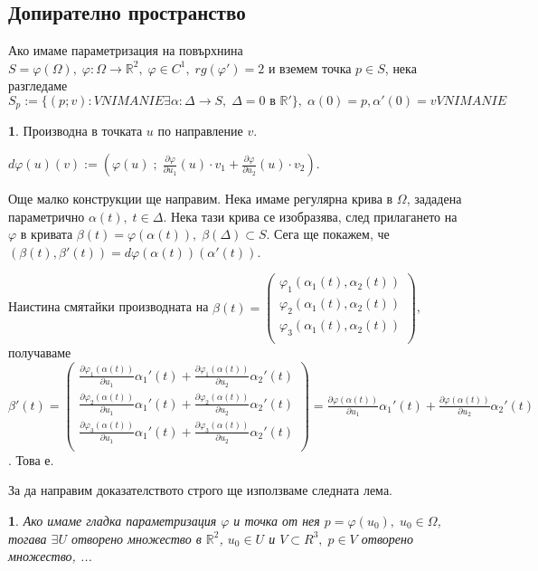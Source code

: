 \documentclass[11pt]{article}
\numberwithin{equation}{section}
\numberwithin{figure}{section}
\numberwithin{table}{section}
\theoremstyle{plain}
\theoremstyle{definition}
\newtheorem{defn}[thm]{\protect\definitionname}
\theoremstyle{remark}
\theoremstyle{definition}
\theoremstyle{remark}
\theoremstyle{plain}
\newtheorem{lem}[thm]{\protect\lemmaname}
\theoremstyle{definition}
\theoremstyle{definition}
\theoremstyle{plain}
\theoremstyle{plain}
\theoremstyle{plain}
\theoremstyle{definition}
\theoremstyle{plain}
\providecommand{\definitionname}{Дефиниция}
\providecommand{\lemmaname}{Лема}
\newcommand*{\R}{\mathbb{R}}
\newcommand*{\p}{\partial}
\begin{document}
\subsection{Допирателно пространство}
Ако имаме параметризация на повърхнина $S = \varphi(\Omega), \; \varphi:\Omega\rightarrow \R^2, \; \varphi \in C^1, \; rg(\varphi')=2$ и вземем точка $p\in S$, нека разгледаме $S_p:=\{(p;v):VNIMANIE\exists \alpha:\Delta\rightarrow S, \; \Delta = 0 \text{ в } \R'\}, \; \alpha(0)=p, \alpha'(0)=vVNIMANIE$

\begin{defn} Производна в точката $u$ по направление $v$. 

$d\varphi(u)(v) := (\varphi(u)\; ; \;\frac{\p\varphi}{\p u_1}(u)\cdot v_1+\frac{\p\varphi}{\p u_2}(u)\cdot v_2)$.
\end{defn}

Още малко конструкции ще направим. Нека имаме регулярна крива в $\Omega$, зададена параметрично $\alpha(t), \; t\in\Delta$. Нека тази крива се изобразява, след прилагането на $\varphi$ в кривата $\beta(t) = \varphi(\alpha(t)), \; \beta(\Delta)\subset S$. Сега ще покажем, че $(\beta(t), \beta'(t)) = d\varphi(\alpha(t))(\alpha'(t))$.

Наистина смятайки производната на $\beta(t) = \begin{pmatrix}
	\varphi_1(\alpha_1(t),\alpha_2(t))\\
	\varphi_2(\alpha_1(t),\alpha_2(t))\\
	\varphi_3(\alpha_1(t),\alpha_2(t))\\
\end{pmatrix}$, получаваме $\beta'(t) = \begin{pmatrix}
	\frac{\p\varphi_1(\alpha(t))}{\p u_1}\alpha_1'(t)+\frac{\p\varphi_1(\alpha(t))}{\p u_2}\alpha_2'(t)\\
	\frac{\p\varphi_2(\alpha(t))}{\p u_1}\alpha_1'(t)+\frac{\p\varphi_2(\alpha(t))}{\p u_2}\alpha_2'(t)\\
	\frac{\p\varphi_3(\alpha(t))}{\p u_1}\alpha_1'(t)+\frac{\p\varphi_3(\alpha(t))}{\p u_2}\alpha_2'(t)\\
\end{pmatrix} = \frac{\p\varphi(\alpha(t))}{\p u_1}\alpha_1'(t)+\frac{\p\varphi(\alpha(t))}{\p u_2}\alpha_2'(t)$. Това е.

За да направим доказателството строго ще използваме следната лема.

\begin{lem}
Ако имаме гладка параметризация $\varphi$ и точка от нея $p=\varphi(u_0), \;u_0\in\Omega$, тогава $\exists U$ отворено множество в $\R^2$, $u_0\in U$ и $V\subset R^3, \; p\in V$ отворено множество, ...
\end{lem}
\end{document}
